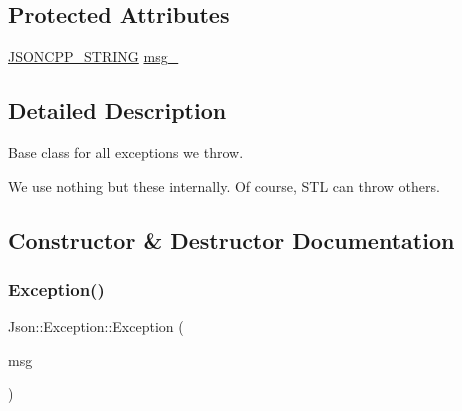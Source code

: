 \subsection*{Protected Attributes}
\begin{DoxyCompactItemize}
\item 
\hyperlink{json_8h_a1e723f95759de062585bc4a8fd3fa4be_a1e723f95759de062585bc4a8fd3fa4be}{J\+S\+O\+N\+C\+P\+P\+\_\+\+S\+T\+R\+I\+NG} \hyperlink{classJson_1_1Exception_aae3cbb8b45bf21480f64502a8329659f_aae3cbb8b45bf21480f64502a8329659f}{msg\+\_\+}
\end{DoxyCompactItemize}


\subsection{Detailed Description}
Base class for all exceptions we throw.

We use nothing but these internally. Of course, S\+TL can throw others. 

\subsection{Constructor \& Destructor Documentation}
\mbox{\label{classJson_1_1Exception_ae764aa42e0755bd4ce9d303e2733fa8f_ae764aa42e0755bd4ce9d303e2733fa8f}} 
\subsubsection{\texorpdfstring{Exception()}{Exception()}}
{\footnotesize\ttfamily Json\+::\+Exception\+::\+Exception (\begin{DoxyParamCaption}\item[{\hyperlink{json_8h_a1e723f95759de062585bc4a8fd3fa4be_a1e723f95759de062585bc4a8fd3fa4be}{J\+S\+O\+N\+C\+P\+P\+\_\+\+S\+T\+R\+I\+NG} const \&}]{msg }\end{DoxyParamCaption})}

\mbox{\label{classJson_1_1Exception_add6af5e0ecdf36f40d7f3554b9786e21_add6af5e0ecdf36f40d7f3554b9786e21}} 

